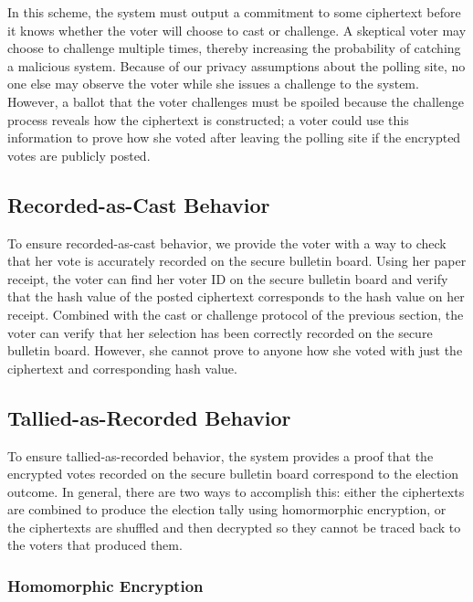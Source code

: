 In this scheme, the system must output a commitment to some ciphertext before it knows whether the voter will choose to cast or challenge. A skeptical voter may choose to challenge multiple times, thereby increasing the probability of catching a malicious system. Because of our privacy assumptions about the polling site, no one else may observe the voter while she issues a challenge to the system. However, a ballot that the voter challenges must be spoiled because the challenge process reveals how the ciphertext is constructed; a voter could use this information to prove how she voted after leaving the polling site if the encrypted votes are publicly posted.

\subsection{Recorded-as-Cast Behavior}

To ensure recorded-as-cast behavior, we provide the voter with a way to check that her vote is accurately recorded on the secure bulletin board. Using her paper receipt, the voter can find her voter ID on the secure bulletin board and verify that the hash value of the posted ciphertext corresponds to the hash value on her receipt. Combined with the cast or challenge protocol of the previous section, the voter can verify that her selection has been correctly recorded on the secure bulletin board. However, she cannot prove to anyone how she voted with just the ciphertext and corresponding hash value.

\subsection{Tallied-as-Recorded Behavior}

To ensure tallied-as-recorded behavior, the system provides a proof that the encrypted votes recorded on the secure bulletin board correspond to the election outcome. In general, there are two ways to accomplish this: either the ciphertexts are combined to produce the election tally using homormorphic encryption, or the ciphertexts are shuffled and then decrypted so they cannot be traced back to the voters that produced them.

\subsubsection{Homomorphic Encryption}

